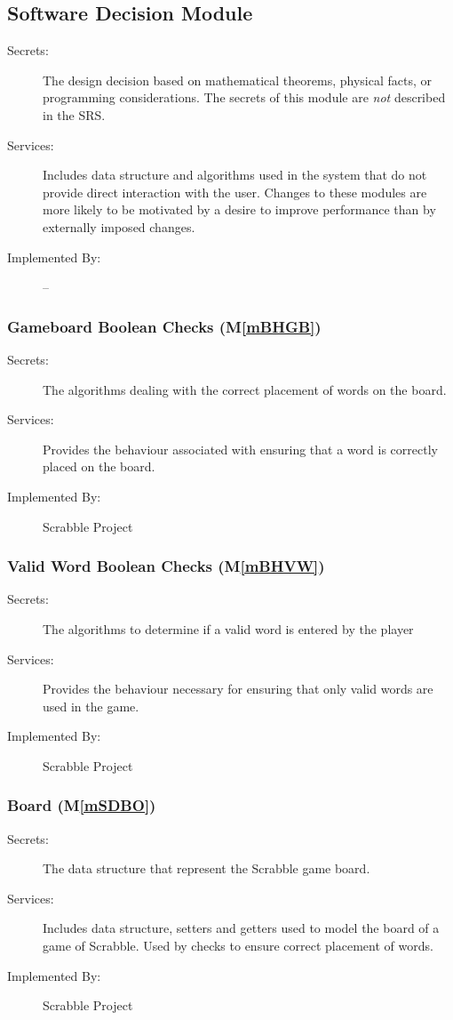 \documentclass[12pt, titlepage]{article}
\newcommand{\mref}[1]{M\ref{#1}}
\begin{document}
\subsection{Software Decision Module}
\begin{description}
\item[Secrets:] The design decision based on mathematical theorems, physical
  facts, or programming considerations. The secrets of this module are
  \emph{not} described in the SRS.
\item[Services:] Includes data structure and algorithms used in the system that
  do not provide direct interaction with the user. Changes to these modules are more likely to be motivated by a desire to improve performance than by externally imposed changes.
\item[Implemented By:] --
\end{description}

\subsubsection{Gameboard Boolean Checks (\mref{mBHGB})}
\begin{description}
\item[Secrets:]The algorithms dealing with the correct placement of words on the board.
\item[Services:]Provides the behaviour associated with ensuring that a word is correctly placed on the board. 
\item[Implemented By:] Scrabble Project
\end{description}

\subsubsection{Valid Word Boolean Checks (\mref{mBHVW})}
\begin{description}
\item[Secrets:]The algorithms to determine if a valid word is entered by the player
\item[Services:] Provides the behaviour necessary for ensuring that only valid words are used in the game.
\item[Implemented By:] Scrabble Project
\end{description}

\subsubsection{Board (\mref{mSDBO})}
\begin{description}
\item[Secrets:] The data structure that represent the Scrabble game board.
\item[Services:] Includes data structure, setters and getters used to model the board of a game of Scrabble. Used by checks to ensure correct placement of words.
\item[Implemented By:] Scrabble Project
\end{description}
\end{document}
